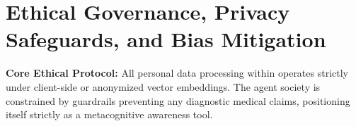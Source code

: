 \section{Ethical Governance, Privacy Safeguards, and Bias Mitigation}
\label{sec:meth_ethics}
\begin{ethicsbox}
    \textbf{Core Ethical Protocol:} All personal data processing within \projectname{} operates strictly under client-side or anonymized vector embeddings. The agent society is constrained by guardrails preventing any diagnostic medical claims, positioning itself strictly as a metacognitive awareness tool.
\end{ethicsbox}
